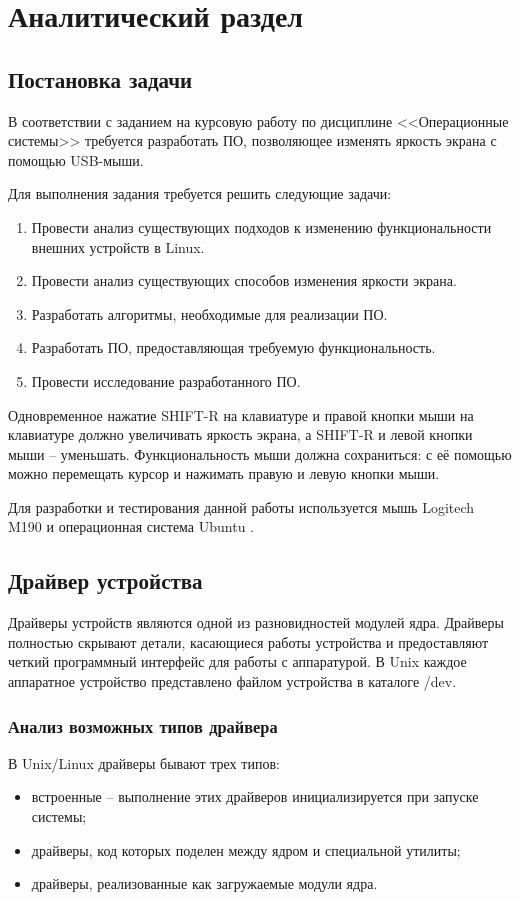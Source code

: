 \section{Аналитический раздел}

\subsection{Постановка задачи}
В соответствии с заданием на курсовую работу по дисциплине <<Операционные системы>> требуется разработать ПО, позволяющее изменять яркость экрана с помощью USB-мыши.

Для выполнения задания требуется решить следующие задачи:
\begin{enumerate}
	\item Провести анализ существующих подходов к изменению функциональности внешних устройств в Linux.
	\item Провести анализ существующих способов изменения яркости экрана.
	\item Разработать алгоритмы, необходимые для реализации ПО.
	\item Разработать ПО, предоставляющая требуемую функциональность.
	\item Провести исследование разработанного ПО.
\end{enumerate}

Одновременное нажатие SHIFT-R на клавиатуре и правой кнопки мыши на клавиатуре должно увеличивать яркость экрана, а SHIFT-R и левой кнопки мыши -- уменьшать.
Функциональность мыши должна сохраниться: с её помощью можно перемещать курсор и нажимать правую и левую кнопки мыши.

Для разработки и тестирования данной работы используется мышь Logitech M190 \cite{mouse} и операционная система Ubuntu \cite{ubuntu}.

\subsection{Драйвер устройства}
Драйверы устройств являются одной из разновидностей модулей ядра.
Драйверы полностью скрывают детали, касающиеся работы устройства и предоставляют четкий программный интерфейс для работы с аппаратурой. 
В Unix каждое аппаратное устройство представлено файлом устройства в каталоге /dev. 

\subsubsection{Анализ возможных типов драйвера}
В Unix/Linux драйверы бывают трех типов:
\begin{itemize}
	\item встроенные -- выполнение этих драйверов инициализируется при запуске системы;
	\item драйверы, код которых поделен между ядром и специальной утилиты;
	\item драйверы, реализованные как загружаемые модули ядра.
\end{itemize}

